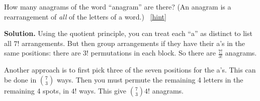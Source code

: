 \documentclass{book}
\begin{document}
\setcounter{project}{115}
\addtocounter{project}{-1}
\begin{activity}[]\label{activity-108}
\hypertarget{p-829}{}%
How many anagrams of the word ``anagram'' are there? (An anagram is a rearrangement of \emph{all} of the letters of a word.)%
~\hfill{\tiny\hyperlink{a-115}{[hint]}\hypertarget{q-115}{}}\par\smallskip%
\noindent\textbf{Solution.}\hypertarget{solution-89}{}\quad%
\hypertarget{p-831}{}%
Using the quotient principle, you can treat each ``a'' as distinct to list all \(7!\) arrangements.  But then group arrangements if they have their a's in the same positions: there are \(3!\) permutations in each block.  So there are \(\frac{7!}{3!}\) anagrams.%
\par
\hypertarget{p-832}{}%
Another approach is to first pick three of the seven positions for the a's.  This can be done in \(\binom{7}{3}\) ways.  Then you must permute the remaining 4 letters in the remaining 4 spots, in \(4!\) ways.  This give \(\binom{7}{3}4!\) anagrams.%
\end{activity}
\end{document}
